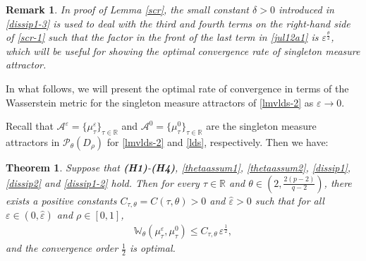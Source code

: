 \documentclass[11pt]{article}
\numberwithin{equation}{section}
\theoremstyle{plain}
\newtheorem{theorem}{Theorem}[section]
\newtheorem{remark}{Remark}[section]
\begin{document}
\begin{remark}
   In proof of Lemma \ref{scr}, 
   the small constant $\delta>0$  introduced in \eqref{dissip1-3}
   is used  to deal with the third and fourth terms on the right-hand side of \eqref{scr-1}
   such that the factor in the front of the  last
   term 
   in \eqref{jul12a1}  is $\varepsilon^{\frac{\theta}{2} }$, which will
   be 
    useful for showing the optimal convergence rate of singleton measure attractor.   
\end{remark}




 In what follows,
 we will present the optimal rate of convergence in terms of the Wasserstein metric for the singleton measure attractors of \eqref{lmvlds-2} as $\varepsilon \to 0$.
   
   
   Recall that
  $\mathcal{A}^\varepsilon = \{ \mu_\tau^\varepsilon \}_{\tau \in \mathbb{R} }$
 and
    $\mathcal{A}^0 = \{ \mu_\tau^0 \}_{\tau \in \mathbb{R} }$
are the
 singleton measure attractors in $\mathcal{P}_{\theta}(D_\rho)$ for \eqref{lmvlds-2}  
 and \eqref{lds}, respectively.
 Then we have:
 
  

\begin{theorem}\label{conv-rate}
   Suppose that {\bf(H1)}-{\bf(H4)}, \eqref{thetaassum1}, \eqref{thetaassum2}, \eqref{dissip1}, \eqref{dissip2} 
   and \eqref{dissip1-2} hold. 
   Then for every $\tau \in \mathbb{R}$ and $\theta \in \left(2, \tfrac{2(p-2)}{q-2} \right)$,
   there exists a positive constants $C_{\tau, \theta} = C(\tau, \theta) > 0$ and $\hat{\varepsilon} >0$ 
   such that for all $\varepsilon \in (0, \hat{\varepsilon} )$ and $\rho \in [0,1]$, 
   \begin{align} \label{cr-0}
         \mathbb{W}_\theta \left( \mu_\tau^\varepsilon, \mu_{\tau}^0 \right)
         \le C_{\tau, \theta} \, \varepsilon^{\frac{1}{2}},
   \end{align}
   and the convergence order $\frac{1}{2}$ is optimal.
\end{theorem}
\end{document}

